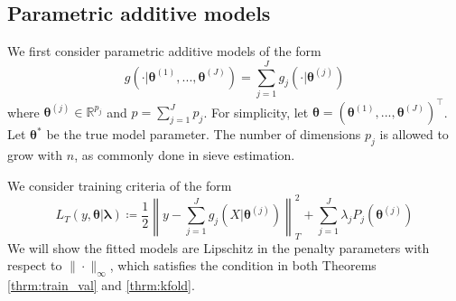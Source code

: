 \documentclass[12pt]{article}
\DeclareMathOperator*{\argmin}{arg\,min}
\begin{document}
\subsection{Parametric additive models}
\label{sec:param_add_models}

We first consider parametric additive models of the form
\begin{equation}
g(\cdot | \boldsymbol{\theta}^{(1)}, ..., \boldsymbol{\theta}^{(J)}) = \sum_{j=1}^J g_j(\cdot | \boldsymbol{\theta}^{(j)})
\end{equation}
where $\boldsymbol{\theta}^{(j)} \in \mathbb{R}^{p_j}$ and $p = \sum_{j=1}^J p_j$. For simplicity, let $\boldsymbol{\theta} = \left (\boldsymbol{\theta}^{(1)}, ..., \boldsymbol{\theta}^{(J)} \right )^\top$. Let $\boldsymbol{\theta}^*$ be the true model parameter. The number of dimensions $p_j$ is allowed to grow with $n$, as commonly done in sieve estimation. 

We consider training criteria of the form
\begin{equation}
\label{eq:param_add}
L_T \left (y, \boldsymbol{\theta} | \boldsymbol{\lambda} \right) 
\coloneqq \frac{1}{2} \left  \| y -  \sum_{j=1}^J g_j(X| \boldsymbol{\theta}^{(j)}) \right \|^2_T 
+ \sum_{j=1}^J \lambda_j P_j(\boldsymbol{\theta}^{(j)})
\end{equation}
We will show the fitted models are Lipschitz in the penalty parameters with respect to $\| \cdot \|_\infty$, which satisfies the condition in both Theorems \ref{thrm:train_val} and \ref{thrm:kfold}.

\end{document}
